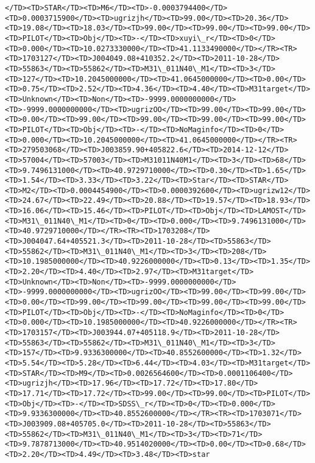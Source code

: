 \documentclass[11pt]{article}
\begin{document}
\begin{Verbatim}[commandchars=\\\{\}]
</TD><TD>STAR</TD><TD>M6</TD><TD>-0.0003794400</TD><TD>0.0003715900</TD><TD>ugrizjh</TD><TD>99.00</TD><TD>20.36</TD><TD>19.08</TD><TD>18.03</TD><TD>99.00</TD><TD>99.00</TD><TD>99.00</TD><TD>PILOT</TD><TD>Obj</TD><TD>-</TD><TD>xuyi\_r</TD><TD>0</TD><TD>0.000</TD><TD>10.0273330000</TD><TD>41.1133490000</TD></TR><TR><TD>1703127</TD><TD>J004049.08+410352.2</TD><TD>2011-10-28</TD><TD>55863</TD><TD>55862</TD><TD>M31\_011N40\_M1</TD><TD>3</TD><TD>127</TD><TD>10.2045000000</TD><TD>41.0645000000</TD><TD>0.00</TD><TD>0.75</TD><TD>2.52</TD><TD>4.36</TD><TD>4.40</TD><TD>M31target</TD><TD>Unknown</TD><TD>Non</TD><TD>-9999.0000000000</TD><TD>-9999.0000000000</TD><TD>ugrizOO</TD><TD>99.00</TD><TD>99.00</TD><TD>0.00</TD><TD>99.00</TD><TD>99.00</TD><TD>99.00</TD><TD>99.00</TD><TD>PILOT</TD><TD>Obj</TD><TD>-</TD><TD>NoMaginfo</TD><TD>0</TD><TD>0.000</TD><TD>10.2045000000</TD><TD>41.0645000000</TD></TR><TR><TD>279503068</TD><TD>J003859.90+405822.6</TD><TD>2014-12-12</TD><TD>57004</TD><TD>57003</TD><TD>M31011N40M1</TD><TD>3</TD><TD>68</TD><TD>9.7496131000</TD><TD>40.9729710000</TD><TD>0.30</TD><TD>1.65</TD><TD>1.54</TD><TD>3.33</TD><TD>3.22</TD><TD>Star</TD><TD>STAR</TD><TD>M2</TD><TD>0.0004454900</TD><TD>0.0000392600</TD><TD>ugrizw12</TD><TD>24.67</TD><TD>22.49</TD><TD>20.88</TD><TD>19.57</TD><TD>18.93</TD><TD>16.06</TD><TD>15.46</TD><TD>PILOT</TD><TD>Obj</TD><TD>LAMOST</TD><TD>M31\_011N40\_M1</TD><TD>0</TD><TD>0.000</TD><TD>9.7496131000</TD><TD>40.9729710000</TD></TR><TR><TD>1703208</TD><TD>J004047.64+405521.3</TD><TD>2011-10-28</TD><TD>55863</TD><TD>55862</TD><TD>M31\_011N40\_M1</TD><TD>3</TD><TD>208</TD><TD>10.1985000000</TD><TD>40.9226000000</TD><TD>0.13</TD><TD>1.35</TD><TD>2.20</TD><TD>4.40</TD><TD>2.97</TD><TD>M31target</TD><TD>Unknown</TD><TD>Non</TD><TD>-9999.0000000000</TD><TD>-9999.0000000000</TD><TD>ugrizOO</TD><TD>99.00</TD><TD>99.00</TD><TD>0.00</TD><TD>99.00</TD><TD>99.00</TD><TD>99.00</TD><TD>99.00</TD><TD>PILOT</TD><TD>Obj</TD><TD>-</TD><TD>NoMaginfo</TD><TD>0</TD><TD>0.000</TD><TD>10.1985000000</TD><TD>40.9226000000</TD></TR><TR><TD>1703157</TD><TD>J003944.07+405118.9</TD><TD>2011-10-28</TD><TD>55863</TD><TD>55862</TD><TD>M31\_011N40\_M1</TD><TD>3</TD><TD>157</TD><TD>9.9336300000</TD><TD>40.8552600000</TD><TD>1.32</TD><TD>5.54</TD><TD>5.28</TD><TD>6.44</TD><TD>4.03</TD><TD>M31target</TD><TD>STAR</TD><TD>M9</TD><TD>0.0026564600</TD><TD>0.0001106400</TD><TD>ugrizjh</TD><TD>17.96</TD><TD>17.72</TD><TD>17.80</TD><TD>17.71</TD><TD>17.72</TD><TD>99.00</TD><TD>99.00</TD><TD>PILOT</TD><TD>Obj</TD><TD>-</TD><TD>SDSS\_r</TD><TD>0</TD><TD>0.000</TD><TD>9.9336300000</TD><TD>40.8552600000</TD></TR><TR><TD>1703071</TD><TD>J003909.08+405705.0</TD><TD>2011-10-28</TD><TD>55863</TD><TD>55862</TD><TD>M31\_011N40\_M1</TD><TD>3</TD><TD>71</TD><TD>9.7878713000</TD><TD>40.9514020000</TD><TD>0.00</TD><TD>0.68</TD><TD>2.20</TD><TD>4.49</TD><TD>3.48</TD><TD>star     
\end{Verbatim}
\end{document}
